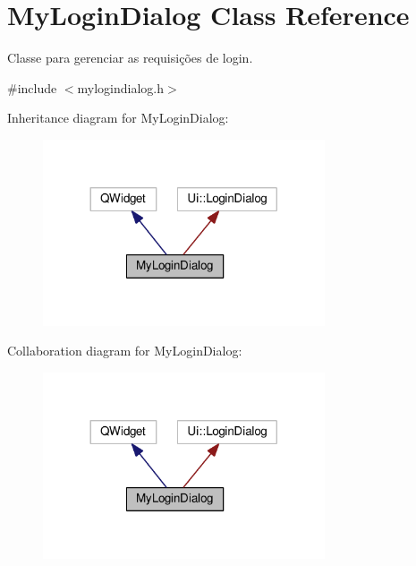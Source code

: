 \hypertarget{classMyLoginDialog}{}\section{My\+Login\+Dialog Class Reference}
\label{classMyLoginDialog}


Classe para gerenciar as requisições de login.  




{\ttfamily \#include $<$mylogindialog.\+h$>$}



Inheritance diagram for My\+Login\+Dialog\+:\nopagebreak
\begin{figure}[H]
\begin{center}
\leavevmode
\includegraphics[width=236pt]{d5/d81/classMyLoginDialog__inherit__graph}
\end{center}
\end{figure}


Collaboration diagram for My\+Login\+Dialog\+:\nopagebreak
\begin{figure}[H]
\begin{center}
\leavevmode
\includegraphics[width=236pt]{db/d47/classMyLoginDialog__coll__graph}
\end{center}
\end{figure}
